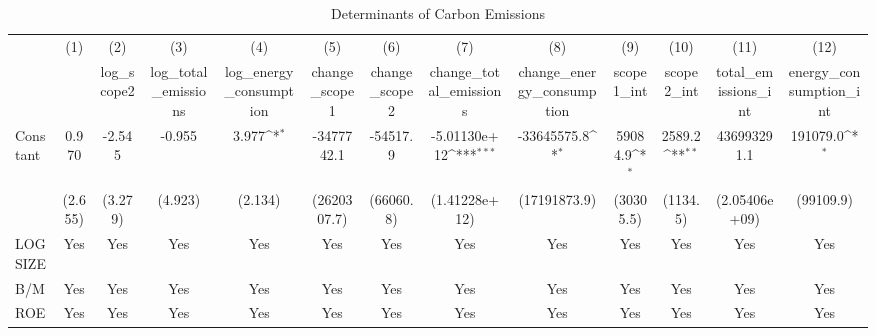 \begin{table}[htbp]\centering
\def\sym#1{\ifmmode^{#1}\else\(^{#1}\)\fi}
\caption{Determinants of Carbon Emissions}
\begin{tabular}{l*{12}{c}}
\hline\hline
                    &\multicolumn{1}{c}{(1)}         &\multicolumn{1}{c}{(2)}         &\multicolumn{1}{c}{(3)}         &\multicolumn{1}{c}{(4)}         &\multicolumn{1}{c}{(5)}         &\multicolumn{1}{c}{(6)}         &\multicolumn{1}{c}{(7)}         &\multicolumn{1}{c}{(8)}         &\multicolumn{1}{c}{(9)}         &\multicolumn{1}{c}{(10)}         &\multicolumn{1}{c}{(11)}         &\multicolumn{1}{c}{(12)}         \\
                    &                     &  log\_scope2         &log\_total\_emissions         &log\_energy\_consumption         &change\_scope1         &change\_scope2         &change\_total\_emissions         &change\_energy\_consumption         &  scope1\_int         &  scope2\_int         &total\_emissions\_int         &energy\_consumption\_int         \\
\hline
Constant            &       0.970         &      -2.545         &      -0.955         &       3.977\sym{*}  &  -3477742.1         &    -54517.9         &-5.01130e+12\sym{***}& -33645575.8\sym{*}  &     59084.9\sym{*}  &      2589.2\sym{**} & 436993291.1         &    191079.0\sym{*}  \\
                    &     (2.655)         &     (3.279)         &     (4.923)         &     (2.134)         & (2620307.7)         &   (66060.8)         &(1.41228e+12)         &(17191873.9)         &   (30305.5)         &    (1134.5)         &(2.05406e+09)         &   (99109.9)         \\
[1em]
LOGSIZE             &         Yes         &         Yes         &         Yes         &         Yes         &         Yes         &         Yes         &         Yes         &         Yes         &         Yes         &         Yes         &         Yes         &         Yes         \\
[1em]
B/M                 &         Yes         &         Yes         &         Yes         &         Yes         &         Yes         &         Yes         &         Yes         &         Yes         &         Yes         &         Yes         &         Yes         &         Yes         \\
[1em]
ROE                 &         Yes         &         Yes         &         Yes         &         Yes         &         Yes         &         Yes         &         Yes         &         Yes         &         Yes         &         Yes         &         Yes         &         Yes         \\

\end{tabular}
\end{table}
